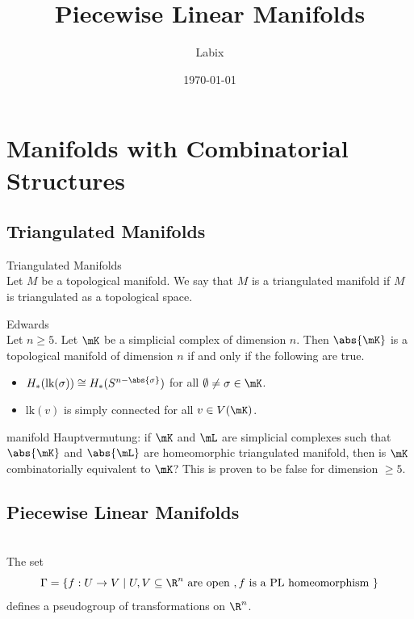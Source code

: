 \documentclass[a4paper]{article}
\title{Piecewise Linear Manifolds}
\author{Labix}
\date{\today}
\begin{document}
\maketitle
\begin{abstract}
\end{abstract}
\pagebreak
\tableofcontents

\pagebreak
\section{Manifolds with Combinatorial Structures}
\subsection{Triangulated Manifolds}
\begin{defn}{Triangulated Manifolds}{}\\
Let $M$ be a topological manifold. We say that $M$ is a triangulated manifold if $M$ is triangulated as a topological space. 
\end{defn}

\begin{thm}{Edwards}{}\\
Let $n\geq 5$. Let $\mK$ be a simplicial complex of dimension $n$. Then $\abs{\mK}$ is a topological manifold of dimension $n$ if and only if the following are true. 
\begin{itemize}
\item $H_\ast(\text{lk}(\sigma))\cong H_\ast(S^{n-\abs{\sigma}})$ for all $\emptyset\neq\sigma\in\mK$. 
\item $\text{lk}(v)$ is simply connected for all $v\in V(\mK)$. 
\end{itemize}
\end{thm}

manifold Hauptvermutung: if $\mK$ and $\mL$ are simplicial complexes such that $\abs{\mK}$ and $\abs{\mL}$ are homeomorphic triangulated manifold, then is $\mK$ combinatorially equivalent to $\mK$? This is proven to be false for dimension $\geq 5$. 

\subsection{Piecewise Linear Manifolds}
\begin{prp}{}{}\\
The set $$\Gamma=\{f:U\to V\;|\;U,V\subseteq\R^n\text{ are open }, f\text{ is a PL homeomorphism }\}$$ defines a pseudogroup of transformations on $\R^n$. 
\end{prp}
\end{document}
